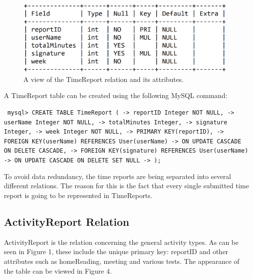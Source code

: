 \documentclass{article}
\begin{document}
\begin{figure}[H]
     \centering
     \includegraphics[width=11cm]{images/SQL_tables/timereport.png}
     \renewcommand\figurename{Figure}
     \caption{A view of the TimeReport relation and its attributes.}
     \label{fig:my_label}
 \end{figure}
\newline

A TimeReport table can be created using the following MySQL command:
\newline

\small
\texttt{
\noindent mysql> CREATE TABLE TimeReport (\newline
\indent \indent \indent -> reportID Integer NOT NULL,\newline
\indent \indent \indent -> userName Integer NOT NULL,\newline
\indent \indent \indent -> totalMinutes Integer,\newline
\indent \indent \indent -> signature Integer,\newline
\indent \indent \indent -> week Integer NOT NULL,\newline
\indent \indent \indent -> PRIMARY KEY(reportID),\newline
\indent \indent \indent -> FOREIGN KEY(userName) REFERENCES User(userName)\newline
\indent \indent \indent -> ON UPDATE CASCADE ON DELETE CASCADE,\newline
\indent \indent \indent -> FOREIGN KEY(signature) REFERENCES User(userName)\newline
\indent \indent \indent -> ON UPDATE CASCADE ON DELETE SET NULL\newline
\indent \indent \indent -> );
}
\normalsize
\newline

To avoid data redundancy, the time reports are being separated into several different relations. The reason for this is the fact that every single submitted time report is going to be represented in TimeReports.

\subsection{ActivityReport Relation}
ActivityReport is the relation concerning the general activity types. As can be seen in Figure 1, these include the unique primary key: reportID and other attributes such as homeReading, meeting and various tests. The appearance of the table can be viewed in Figure 4.
\newline
\end{document}

